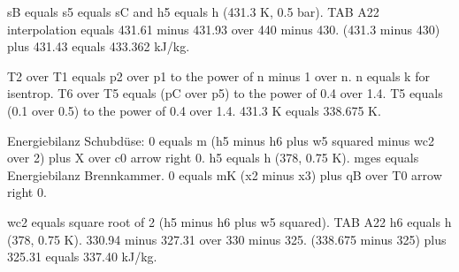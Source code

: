 sB equals s5 equals sC and h5 equals h (431.3 K, 0.5 bar). TAB A22 interpolation equals 431.61 minus 431.93 over 440 minus 430. (431.3 minus 430) plus 431.43 equals 433.362 kJ/kg.

T2 over T1 equals p2 over p1 to the power of n minus 1 over n. n equals k for isentrop. T6 over T5 equals (pC over p5) to the power of 0.4 over 1.4. T5 equals (0.1 over 0.5) to the power of 0.4 over 1.4. 431.3 K equals 338.675 K.

Energiebilanz Schubdüse:
0 equals m (h5 minus h6 plus w5 squared minus wc2 over 2) plus X over c0 arrow right 0.
h5 equals h (378, 0.75 K).
mges equals Energiebilanz Brennkammer.
0 equals mK (x2 minus x3) plus qB over T0 arrow right 0.

wc2 equals square root of 2 (h5 minus h6 plus w5 squared).
TAB A22 h6 equals h (378, 0.75 K).
330.94 minus 327.31 over 330 minus 325.
(338.675 minus 325) plus 325.31 equals 337.40 kJ/kg.